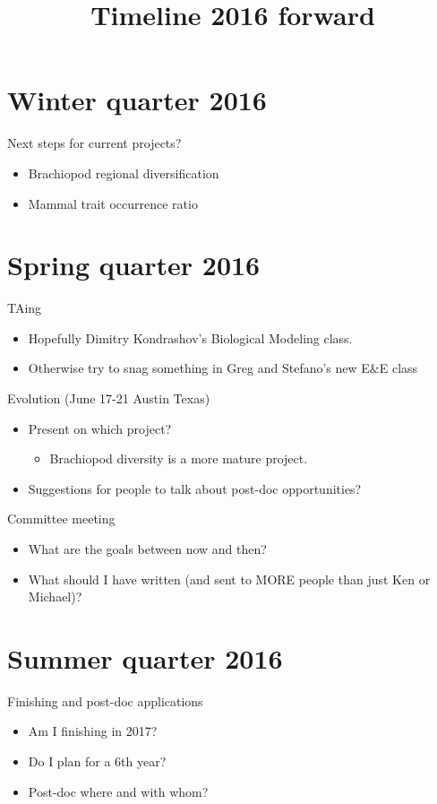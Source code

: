 \documentclass{article}
\title{Timeline 2016 forward}
\date{}
\begin{document}
\linenumbers
\modulolinenumbers[2]

\maketitle

\section{Winter quarter 2016}
Next steps for current projects?
\begin{itemize}
  \item Brachiopod regional diversification
  \item Mammal trait occurrence ratio
\end{itemize}


\section{Spring quarter 2016}
TAing
\begin{itemize}
  \item Hopefully Dimitry Kondrashov's Biological Modeling class.
  \item Otherwise try to snag something in Greg and Stefano's new E\&E class
\end{itemize}

Evolution (June 17-21 Austin Texas)
\begin{itemize}
  \item Present on which project?
    \begin{itemize}
      \item Brachiopod diversity is a more mature project.
    \end{itemize}
  \item Suggestions for people to talk about post-doc opportunities?
\end{itemize}

Committee meeting
\begin{itemize}
  \item What are the goals between now and then?
  \item What should I have written (and sent to MORE people than just Ken or Michael)?
\end{itemize}


\section{Summer quarter 2016}
Finishing and post-doc applications
\begin{itemize}
  \item Am I finishing in 2017? 
  \item Do I plan for a 6th year?
  \item Post-doc where and with whom?
\end{itemize}
\end{document}
